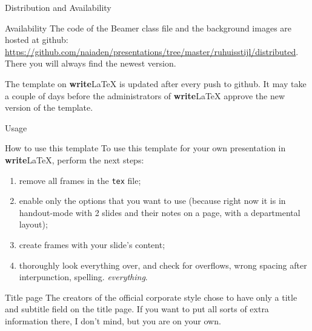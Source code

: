\documentclass[showdate=true, slidenumbers=relative]{beamerruhuisstijl169}
\begin{document}
\begin{frame}{Distribution and Availability}
    \begin{block}{Availability}
        The code of the Beamer class file and the background images are hosted at github: \url{https://github.com/naiaden/presentations/tree/master/ruhuisstijl/distributed}. There you will always find the newest version.

        The template on \textbf{write}\LaTeX{} is updated after every push to github. It may take a couple of days before the administrators of \textbf{write}\LaTeX{} approve the new version of the template.
    \end{block}

\end{frame}

\begin{frame}{Usage}
    \begin{block}{How to use this template}
        To use this template for your own presentation in \textbf{write}\LaTeX{}, perform the next steps:
        \begin{enumerate}
            \item remove all frames in the \texttt{tex} file;
            \item enable only the options that you want to use (because right now it is in handout-mode with 2 slides and their notes on a page, with a departmental layout);
            \item create frames with your slide's content;
            \item thoroughly look everything over, and check for overflows, wrong spacing after interpunction, spelling. \emph{everything}.
        \end{enumerate}
    \end{block}

    \begin{block}{Title page}
        The creators of the official corporate style chose to have only a title and subtitle field on the title page. If you want to put all sorts of extra information there, I don't mind, but you are on your own.
    \end{block}
\end{frame}
\end{document}
